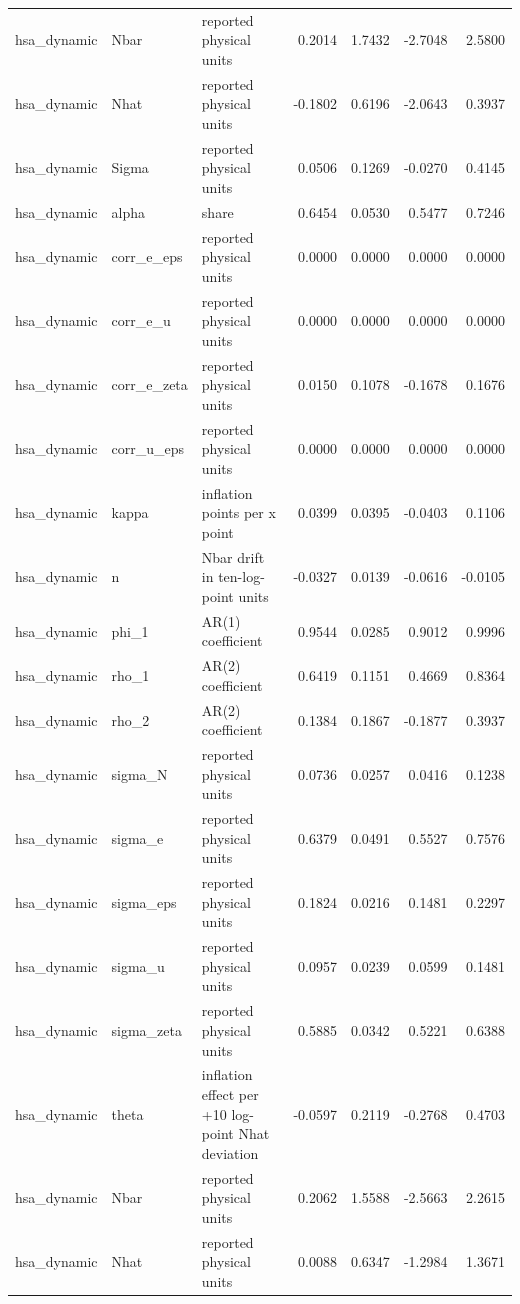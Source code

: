 \begin{tabular}{lllrrrr}
hsa\_dynamic & Nbar & reported physical units & 0.2014 & 1.7432 & -2.7048 & 2.5800 \\
hsa\_dynamic & Nhat & reported physical units & -0.1802 & 0.6196 & -2.0643 & 0.3937 \\
hsa\_dynamic & Sigma & reported physical units & 0.0506 & 0.1269 & -0.0270 & 0.4145 \\
hsa\_dynamic & alpha & share & 0.6454 & 0.0530 & 0.5477 & 0.7246 \\
hsa\_dynamic & corr\_e\_eps & reported physical units & 0.0000 & 0.0000 & 0.0000 & 0.0000 \\
hsa\_dynamic & corr\_e\_u & reported physical units & 0.0000 & 0.0000 & 0.0000 & 0.0000 \\
hsa\_dynamic & corr\_e\_zeta & reported physical units & 0.0150 & 0.1078 & -0.1678 & 0.1676 \\
hsa\_dynamic & corr\_u\_eps & reported physical units & 0.0000 & 0.0000 & 0.0000 & 0.0000 \\
hsa\_dynamic & kappa & inflation points per x point & 0.0399 & 0.0395 & -0.0403 & 0.1106 \\
hsa\_dynamic & n & Nbar drift in ten-log-point units & -0.0327 & 0.0139 & -0.0616 & -0.0105 \\
hsa\_dynamic & phi\_1 & AR(1) coefficient & 0.9544 & 0.0285 & 0.9012 & 0.9996 \\
hsa\_dynamic & rho\_1 & AR(2) coefficient & 0.6419 & 0.1151 & 0.4669 & 0.8364 \\
hsa\_dynamic & rho\_2 & AR(2) coefficient & 0.1384 & 0.1867 & -0.1877 & 0.3937 \\
hsa\_dynamic & sigma\_N & reported physical units & 0.0736 & 0.0257 & 0.0416 & 0.1238 \\
hsa\_dynamic & sigma\_e & reported physical units & 0.6379 & 0.0491 & 0.5527 & 0.7576 \\
hsa\_dynamic & sigma\_eps & reported physical units & 0.1824 & 0.0216 & 0.1481 & 0.2297 \\
hsa\_dynamic & sigma\_u & reported physical units & 0.0957 & 0.0239 & 0.0599 & 0.1481 \\
hsa\_dynamic & sigma\_zeta & reported physical units & 0.5885 & 0.0342 & 0.5221 & 0.6388 \\
hsa\_dynamic & theta & inflation effect per +10 log-point Nhat deviation & -0.0597 & 0.2119 & -0.2768 & 0.4703 \\
hsa\_dynamic & Nbar & reported physical units & 0.2062 & 1.5588 & -2.5663 & 2.2615 \\
hsa\_dynamic & Nhat & reported physical units & 0.0088 & 0.6347 & -1.2984 & 1.3671 \\

\end{tabular}
